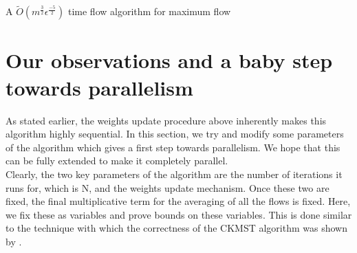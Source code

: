 \documentclass[BTech]{iitmdiss}
\begin{document}
	      \begin{algorithm}[H]
	        \caption{A $\widetilde{O}(m^{\frac{3}{2}}\epsilon^{\frac{-5}{2}})$ time flow algorithm for maximum flow}
	      \end{algorithm}
	    
	\section{Our observations and a baby step towards parallelism}
	  As stated earlier, the weights update procedure above inherently makes this algorithm highly sequential. In this section, we try and modify 
	  some parameters of the algorithm which gives a first step towards parallelism. We hope that this can be fully extended to make it completely
	  parallel. \\
	  
	  Clearly, the two key parameters of the algorithm are the number of iterations it runs for, which is N, and the weights update mechanism.
	  Once these two are fixed, the final multiplicative term for the averaging of all the flows is fixed. Here, we fix these as variables and prove bounds 
	  on these variables. This is done similar to the technique with which the correctness of the CKMST algorithm was shown by \cite{DBLP:journals/corr/abs-1010-2921}. \\
	  
\end{document}
